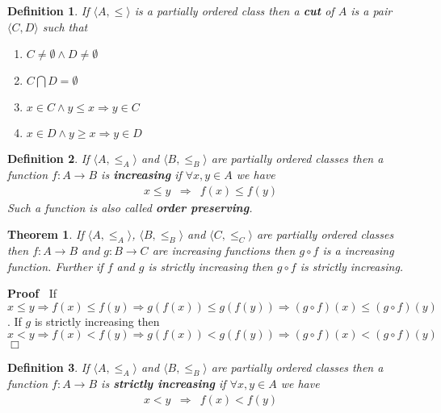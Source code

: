 \documentclass{book}
\newcommand{\tmtextbf}[1]{{\bfseries{#1}}}
\newenvironment{proof}{\noindent\textbf{Proof\ }}{\hspace*{\fill}$\Box$\medskip}
\newtheorem{definition}{Definition}
{\theorembodyfont{\rmfamily}\newtheorem{example}{Example}}
\newtheorem{theorem}{Theorem}
\begin{document}
{{\begin{definition}
  If $\langle A, \leqslant \rangle$ is a partially ordered class then a
  \tmtextbf{cut} of $A$ is a pair $\langle C, D \rangle$ such that
  \begin{enumerate}
    \item $C \neq \emptyset \wedge D \neq \emptyset$
    
    \item $C \bigcap D = \emptyset$
    
    \item $x \in C \wedge y \leqslant x \Rightarrow y \in C$
    
    \item $x \in D \wedge y \geqslant x \Rightarrow y \in D$
  \end{enumerate}
\end{definition}

\begin{definition}
  {}\label{increasing function}If $\langle A,
  \leqslant_A \rangle$ and $\langle B, \leqslant_B \rangle$ are partially
  ordered classes then a function $f : A \rightarrow B$ is
  \tmtextbf{increasing} if $\forall x, y \in A$ we have
  \begin{eqnarray*}
    x \leqslant y & \Rightarrow & f (x) \leqslant f (y)
  \end{eqnarray*}
  Such a function is also called \tmtextbf{order preserving}.
\end{definition}

\begin{theorem}
  \label{composition of increasing functions}If $\langle A, \leqslant_A
  \rangle$, $\langle B, \leqslant_B \rangle$ and $\langle C, \leqslant_C
  \rangle$ are partially ordered classes then $f : A \rightarrow B$ and $g : B
  \rightarrow C$ are increasing functions then $g \circ f$ is a increasing
  function. Further if $f$ and $g$ is strictly increasing then $g \circ f$ is
  strictly increasing.
\end{theorem}

\begin{proof}
  If $x \leqslant y \Rightarrow f (x) \leqslant f (y) \Rightarrow g (f (x))
  \leqslant g (f (y)) \Rightarrow (g \circ f) (x) \leqslant (g \circ f) (y)$.
  If $g$ is strictly increasing then $x < y \Rightarrow f (x) < f (y)
  \Rightarrow g (f (x)) < g (f (y)) \Rightarrow (g \circ f) (x) < (g \circ f)
  (y)$
\end{proof}

\begin{definition}
  {}\label{strictly increasing function}If
  $\langle A, \leqslant_A \rangle$ and $\langle B, \leqslant_B \rangle$ are
  partially ordered classes then a function $f : A \rightarrow B$ is
  \tmtextbf{strictly increasing} if $\forall x, y \in A$ we have
  \begin{eqnarray*}
    x < y & \Rightarrow & f (x) < f (y)
  \end{eqnarray*}
\end{definition}

}}
\end{document}

